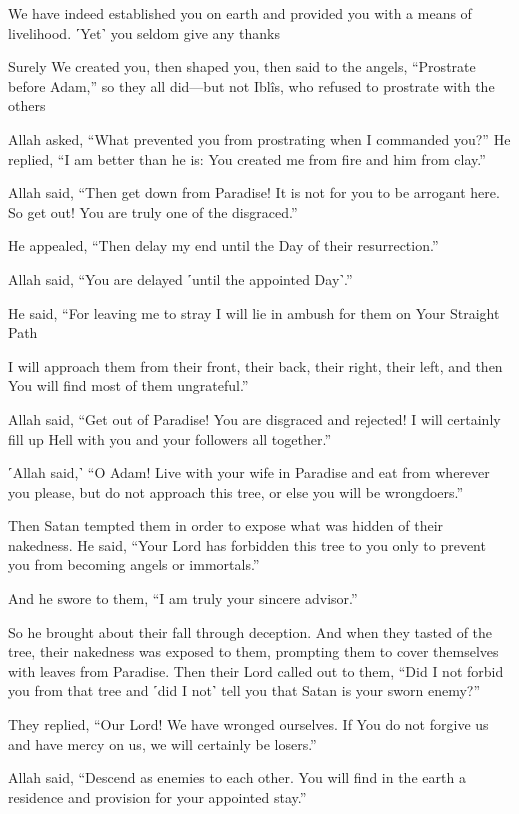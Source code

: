 We have indeed established you on earth and provided you with a means of livelihood. ˹Yet˺ you seldom give any thanks

Surely We created you, then shaped you, then said to the angels, “Prostrate before Adam,” so they all did—but not Iblîs, who refused to prostrate with the others

Allah asked, “What prevented you from prostrating when I commanded you?” He replied, “I am better than he is: You created me from fire and him from clay.”

Allah said, “Then get down from Paradise! It is not for you to be arrogant here. So get out! You are truly one of the disgraced.”

He appealed, “Then delay my end until the Day of their resurrection.”

Allah said, “You are delayed ˹until the appointed Day˺.”

He said, “For leaving me to stray I will lie in ambush for them on Your Straight Path

I will approach them from their front, their back, their right, their left, and then You will find most of them ungrateful.”

Allah said, “Get out of Paradise! You are disgraced and rejected! I will certainly fill up Hell with you and your followers all together.”

˹Allah said,˺ “O Adam! Live with your wife in Paradise and eat from wherever you please, but do not approach this tree, or else you will be wrongdoers.”

Then Satan tempted them in order to expose what was hidden of their nakedness. He said, “Your Lord has forbidden this tree to you only to prevent you from becoming angels or immortals.”

And he swore to them, “I am truly your sincere advisor.”

So he brought about their fall through deception. And when they tasted of the tree, their nakedness was exposed to them, prompting them to cover themselves with leaves from Paradise. Then their Lord called out to them, “Did I not forbid you from that tree and ˹did I not˺ tell you that Satan is your sworn enemy?”

They replied, “Our Lord! We have wronged ourselves. If You do not forgive us and have mercy on us, we will certainly be losers.”

Allah said, “Descend as enemies to each other. You will find in the earth a residence and provision for your appointed stay.”

